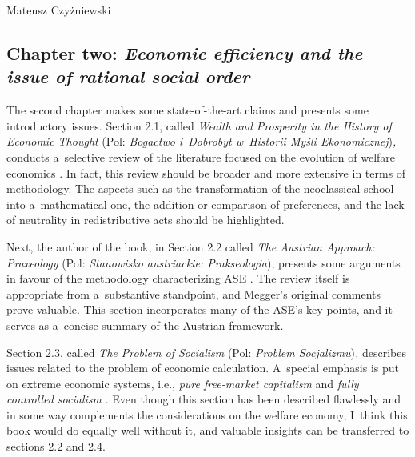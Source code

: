 \begin{newrevengenv}{Mateusz Czyżniewski}
\subsection{Chapter two: \textit{Economic efficiency and the issue of rational social order}}



The second chapter makes some state-of-the-art claims and presents some introductory issues. Section 2.1, called \textit{Wealth and Prosperity in the History of Economic Thought} (Pol: \textit{Bogactwo i~Dobrobyt w~Historii Myśli Ekonomicznej})\textit{,} conducts a~selective review of the literature focused on the evolution of welfare economics 
\parencite[][pp.25–34]{megger_sprawiedliwosc_2021}. %
 In fact, this review should be broader and more extensive in terms of methodology. The aspects such as the transformation of the neoclassical school into a~mathematical one, the addition or comparison of preferences, and the lack of neutrality in redistributive acts should be highlighted.



Next, the author of the book, in Section 2.2 called \textit{The Austrian Approach: Praxeology} (Pol: \textit{Stanowisko austriackie: Prakseologia}), presents some arguments in favour of the methodology characterizing ASE 
\parencite[][pp.34–43]{megger_sprawiedliwosc_2021}. %
 The review itself is appropriate from a~substantive standpoint, and Megger's original comments prove valuable. This section incorporates many of the ASE's key points, and it serves as a~concise summary of the Austrian framework.



Section 2.3, called \textit{The Problem of Socialism} (Pol: \textit{Problem Socjalizmu})\textit{,} describes issues related to the problem of economic calculation. A~special emphasis is put on extreme economic systems, i.e., \textit{pure free-market capitalism} and \textit{fully controlled socialism} 
\parencite[][pp.43–49]{megger_sprawiedliwosc_2021}. %
 Even though this section has been described flawlessly and in some way complements the considerations on the welfare economy, I~think this book would do equally well without it, and valuable insights can be transferred to sections 2.2 and 2.4.




\end{newrevengenv}
